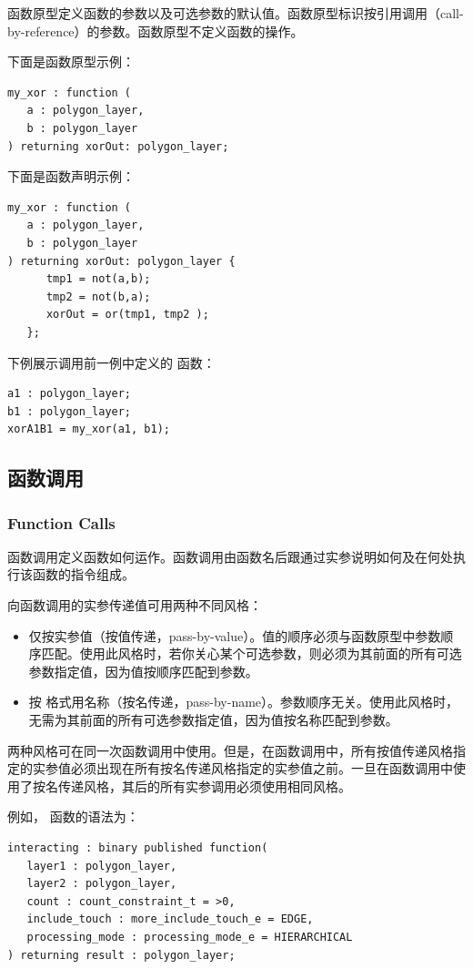 函数原型定义函数的参数以及可选参数的默认值。函数原型标识按引用调用（call-by-reference）的参数。函数原型不定义函数的操作。

下面是函数原型示例：
\begin{lstlisting}[style=pxl]
my_xor : function (
   a : polygon_layer,
   b : polygon_layer
) returning xorOut: polygon_layer;
\end{lstlisting}

下面是函数声明示例：
\begin{lstlisting}[style=pxl]
my_xor : function (
   a : polygon_layer,
   b : polygon_layer
) returning xorOut: polygon_layer {
      tmp1 = not(a,b);
      tmp2 = not(b,a);
      xorOut = or(tmp1, tmp2 );
   };
\end{lstlisting}

下例展示调用前一例中定义的  函数：
\begin{lstlisting}[style=pxl]
a1 : polygon_layer;
b1 : polygon_layer;
xorA1B1 = my_xor(a1, b1);
\end{lstlisting}

\subsection{函数调用}
\subsubsection*{Function Calls}

函数调用定义函数如何运作。函数调用由函数名后跟通过实参说明如何及在何处执行该函数的指令组成。

向函数调用的实参传递值可用两种不同风格：
\begin{itemize}
  \item 仅按实参值（按值传递，pass-by-value）。值的顺序必须与函数原型中参数顺序匹配。使用此风格时，若你关心某个可选参数，则必须为其前面的所有可选参数指定值，因为值按顺序匹配到参数。
  \item 按  格式用名称（按名传递，pass-by-name）。参数顺序无关。使用此风格时，无需为其前面的所有可选参数指定值，因为值按名称匹配到参数。
\end{itemize}

两种风格可在同一次函数调用中使用。但是，在函数调用中，所有按值传递风格指定的实参值必须出现在所有按名传递风格指定的实参值之前。一旦在函数调用中使用了按名传递风格，其后的所有实参调用必须使用相同风格。

例如， 函数的语法为：
\begin{lstlisting}[style=pxl]
interacting : binary published function(
   layer1 : polygon_layer,
   layer2 : polygon_layer,
   count : count_constraint_t = >0,
   include_touch : more_include_touch_e = EDGE,
   processing_mode : processing_mode_e = HIERARCHICAL
) returning result : polygon_layer;
\end{lstlisting}

